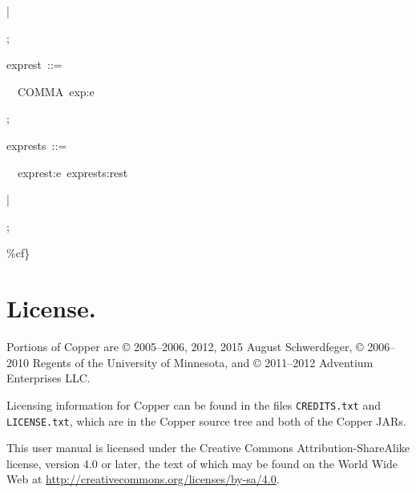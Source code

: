 \documentclass[12pt,english,twoside]{report}
\newenvironment{codeblock}
{\begin{list}{}{
\setlength{\rightmargin}{\leftmargin}
\setlength{\listparindent}{0pt}%
\raggedright
\setlength{\itemsep}{0pt}
\setlength{\parsep}{0pt}
\normalfont\ttfamily}%
 \item[]}
{\end{list}}
\begin{document}
\begin{codeblock}
\begin{codeblock}
\begin{codeblock}
|~

;
\end{codeblock}
exprest~::=
\begin{codeblock}
~~COMMA~exp:e~

;
\end{codeblock}
exprests~::=
\begin{codeblock}
~~exprest:e~exprests:rest~

|~

;
\end{codeblock}
\end{codeblock}
\%cf\}
\end{codeblock}

\chapter{\label{cha:License.}License.}

Portions of Copper are \copyright{} 2005--2006, 2012, 2015 August
Schwerdfeger, \copyright{} 2006--2010 Regents of the University of
Minnesota, and \copyright{} 2011--2012 Adventium Enterprises LLC.

Licensing information for Copper can be found in the files
\texttt{CREDITS.txt} and \texttt{LICENSE.txt}, which are in the Copper
source tree and both of the Copper JARs.

This user manual is licensed under the Creative
Commons Attribution-ShareAlike license, version 4.0 or later, the text
of which may be found on the World Wide Web at
\url{http://creativecommons.org/licenses/by-sa/4.0}.
\end{document}
